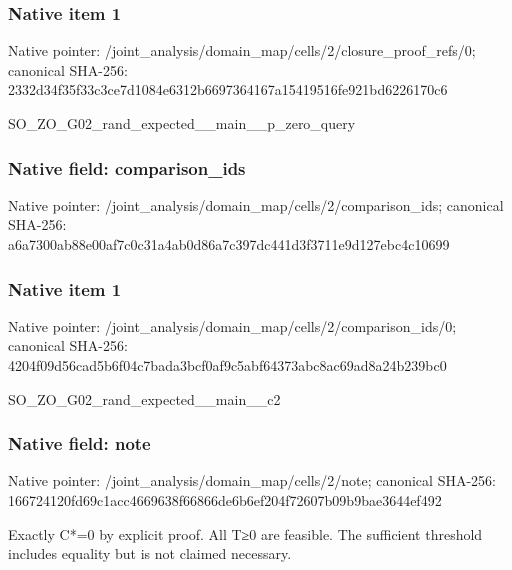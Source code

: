 \documentclass[10pt,a4paper]{article}
\begin{document}
\subsubsection{Native item 1}
Native pointer: /joint\_\allowbreak{}analysis/domain\_\allowbreak{}map/cells/2/closure\_\allowbreak{}proof\_\allowbreak{}refs/0; canonical SHA-256: 2332d34f35f33c3ce7d1084e6312b6697364167a15419516fe921bd6226170c6

\begingroup\raggedright\sloppy SO\_\allowbreak{}ZO\_\allowbreak{}G02\_\allowbreak{}rand\_\allowbreak{}expected\_\allowbreak{}\_\allowbreak{}main\_\allowbreak{}\_\allowbreak{}p\_\allowbreak{}zero\_\allowbreak{}query\par\endgroup

\subsubsection{Native field: comparison\_\allowbreak{}ids}
Native pointer: /joint\_\allowbreak{}analysis/domain\_\allowbreak{}map/cells/2/comparison\_\allowbreak{}ids; canonical SHA-256: a6a7300ab88e00af7c0c31a4ab0d86a7c397dc441d3f3711e9d127ebc4c10699

\subsubsection{Native item 1}
Native pointer: /joint\_\allowbreak{}analysis/domain\_\allowbreak{}map/cells/2/comparison\_\allowbreak{}ids/0; canonical SHA-256: 4204f09d56cad5b6f04c7bada3bcf0af9c5abf64373abc8ac69ad8a24b239bc0

\begingroup\raggedright\sloppy SO\_\allowbreak{}ZO\_\allowbreak{}G02\_\allowbreak{}rand\_\allowbreak{}expected\_\allowbreak{}\_\allowbreak{}main\_\allowbreak{}\_\allowbreak{}c2\par\endgroup

\subsubsection{Native field: note}
Native pointer: /joint\_\allowbreak{}analysis/domain\_\allowbreak{}map/cells/2/note; canonical SHA-256: 166724120fd69c1acc4669638f66866de6b6ef204f72607b09b9bae3644ef492

\begingroup\raggedright\sloppy Exactly C*=\allowbreak{}0 by explicit proof. All T{\AtlasUnicodeSymbols ≥}\allowbreak{}0 are feasible. The sufficient threshold includes equality but is not claimed necessary.\par\endgroup
\end{document}

